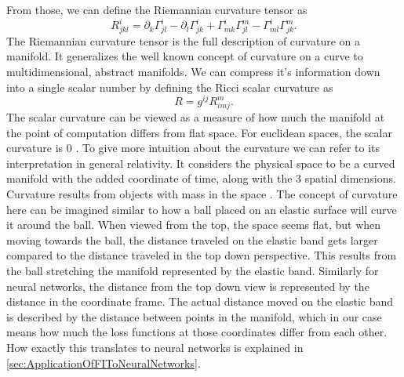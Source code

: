 From those, we can define the Riemannian curvature tensor as \cite{GeneralRelativityBook}
\begin{equation}
	R^{i}_{jkl} = \partial_k \Gamma^i_{jl} - \partial_l \Gamma^i_{jk} + \Gamma^i_{mk}\Gamma^m_{jl} - \Gamma^i_{ml}\Gamma^m_{jk}.
\end{equation}
The Riemannian curvature tensor is the full description of curvature on a manifold. It generalizes the well known concept of curvature on a curve to multidimensional, abstract manifolds. We can compress it's information down into a single scalar number by defining the Ricci scalar curvature as \cite{GeneralRelativityBook}
\begin{equation}
	R = g^{ij} R^m_{imj}.
\end{equation}
The scalar curvature can be viewed as a measure of how much the manifold at the point of computation differs from flat space. For euclidean spaces, the scalar curvature is 0 \cite{GeneralRelativityBook}. To give more intuition about the curvature we can refer to its interpretation in general relativity. It considers the physical space to be a curved manifold with the added coordinate of time, along with the 3 spatial dimensions. Curvature results from objects with mass in the space \cite{GeneralRelativityBook}. The concept of curvature here can be imagined similar to how a ball placed on an elastic surface will curve it around the ball. When viewed from the top, the space seems flat, but when moving towards the ball, the distance traveled on the elastic band gets larger compared to the distance traveled in the top down perspective. This results from the ball stretching the manifold represented by the elastic band. Similarly for neural networks, the distance from the top down view is represented by the distance in the coordinate frame. The actual distance moved on the elastic band is described by the distance between points in the manifold, which in our case means how much the loss functions at those coordinates differ from each other. How exactly this translates to neural networks is explained in \cref{sec:ApplicationOfFIToNeuralNetworks}.

